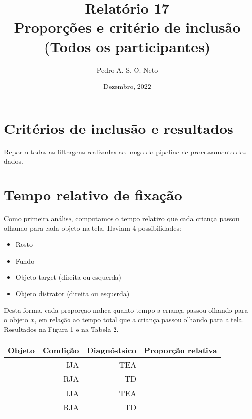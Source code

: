 \documentclass{article}
\title{Relatório 17 \\ Proporções e critério de inclusão (Todos os participantes)}
\author{Pedro A. S. O. Neto}
\date{Dezembro, 2022}
\begin{document}
\maketitle

\section{Critérios de inclusão e resultados}

Reporto todas as filtragens realizadas ao longo do pipeline de processamento dos dados.

\section{Tempo relativo de fixação}


Como primeira análise, computamos o tempo relativo que cada criança passou olhando para cada objeto na tela. Haviam 4 possibilidades:

\begin{itemize}
  \item Rosto
  \item Fundo
  \item Objeto target (direita ou esquerda) 
  \item Objeto distrator (direita ou esquerda)
\end{itemize}

Desta forma, cada proporção indica quanto tempo a criança passou olhando para o objeto $x$, em relação ao tempo total que a criança passou olhando para a tela. Resultados na Figura 1 e na Tabela 2.

\begin{table}[ht]
\centering
\begin{tabular}{rrrr}
  \hline
  Objeto & Condição & Diagnóstsico & Proporção relativa \\
  \hline
   & IJA & TEA &  \\
   & RJA & TD &  \\
   & IJA & TEA &  \\
   & RJA & TD &  \\
  \hline
\end{tabular}
\end{table}
\end{document}
